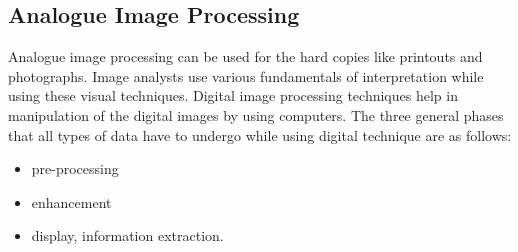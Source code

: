 \documentclass{article}
\begin{document}
\begin{multicols}{2}
            \subsection{Analogue Image Processing}
                Analogue image processing can be used for the hard copies like printouts and photographs. Image analysts use various fundamentals of interpretation while using these visual techniques. Digital image processing techniques help in manipulation of the digital images by using computers. The three general phases that all types of data have to undergo while using digital technique are as follows:
                \begin{itemize}
                    \item pre-processing
                    \item enhancement
                    \item display, information extraction.
                \end{itemize}


\end{multicols}
\end{document}
